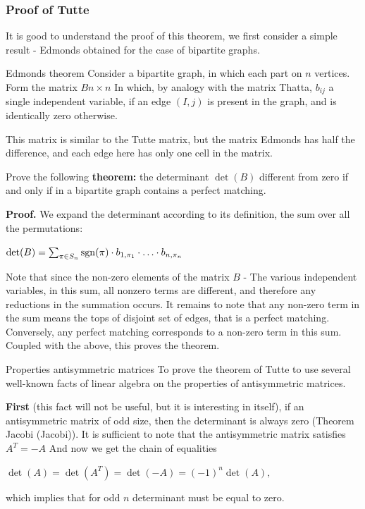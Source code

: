 \subsubsection{ Proof of Tutte }

It is good to understand the proof of this theorem, we first consider a simple result - Edmonds obtained for the case of bipartite graphs.

Edmonds theorem
Consider a bipartite graph, in which each part on $n$ vertices. Form the matrix $B$$n \times n$ In which, by analogy with the matrix Thatta, $b_ {ij}$ a single independent variable, if an edge $(I, j)$ is present in the graph, and is identically zero otherwise.

This matrix is ​​similar to the Tutte matrix, but the matrix Edmonds has half the difference, and each edge here has only one cell in the matrix.

Prove the following \textbf{theorem:} the determinant $\det (B)$ different from zero if and only if in a bipartite graph contains a perfect matching.

\textbf{Proof.} We expand the determinant according to its definition, the sum over all the permutations:

$\det(B)=\sum_{\pi\in S_{n}}{\rm sgn}(\pi)\cdot b_{1,\pi_{1}}\cdot\ldots\cdot b_{n,\pi_{n}}$

Note that since the non-zero elements of the matrix $B$ - The various independent variables, in this sum, all nonzero terms are different, and therefore any reductions in the summation occurs. It remains to note that any non-zero term in the sum means the tops of disjoint set of edges, that is a perfect matching. Conversely, any perfect matching corresponds to a non-zero term in this sum. Coupled with the above, this proves the theorem.

Properties antisymmetric matrices
To prove the theorem of Tutte to use several well-known facts of linear algebra on the properties of antisymmetric matrices.

\textbf{First} (this fact will not be useful, but it is interesting in itself), if an antisymmetric matrix of odd size, then the determinant is always zero (Theorem Jacobi (Jacobi)). It is sufficient to note that the antisymmetric matrix satisfies $A ^ T =-A$ And now we get the chain of equalities

$\det (A) = \det (A ^ T) = \det (-A) = (-1) ^ n \det (A),$

which implies that for odd $n$ determinant must be equal to zero.

